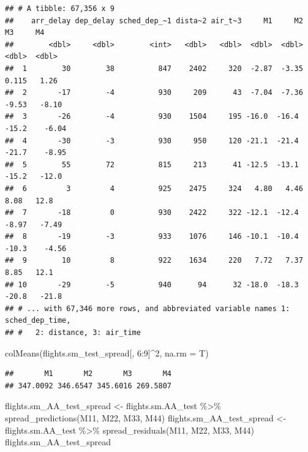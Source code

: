 \documentclass[
]{article}
\newenvironment{Shaded}{\begin{snugshade}}{\end{snugshade}}
\newcommand{\AttributeTok}[1]{\textcolor[rgb]{0.77,0.63,0.00}{#1}}
\newcommand{\DecValTok}[1]{\textcolor[rgb]{0.00,0.00,0.81}{#1}}
\newcommand{\FunctionTok}[1]{\textcolor[rgb]{0.00,0.00,0.00}{#1}}
\newcommand{\NormalTok}[1]{#1}
\newcommand{\OtherTok}[1]{\textcolor[rgb]{0.56,0.35,0.01}{#1}}
\newcommand{\SpecialCharTok}[1]{\textcolor[rgb]{0.00,0.00,0.00}{#1}}
\begin{document}
\begin{verbatim}
## # A tibble: 67,356 x 9
##    arr_delay dep_delay sched_dep_~1 dista~2 air_t~3     M1     M2      M3     M4
##        <dbl>     <dbl>        <int>   <dbl>   <dbl>  <dbl>  <dbl>   <dbl>  <dbl>
##  1        30        38          847    2402     320  -2.87  -3.35   0.115   1.26
##  2       -17        -4          930     209      43  -7.04  -7.36  -9.53   -8.10
##  3       -26        -4          930    1504     195 -16.0  -16.4  -15.2    -6.04
##  4       -30        -3          930     950     120 -21.1  -21.4  -21.7    -8.95
##  5        55        72          815     213      41 -12.5  -13.1  -15.2   -12.0 
##  6         3         4          925    2475     324   4.80   4.46   8.08   12.8 
##  7       -18         0          930    2422     322 -12.1  -12.4   -8.97   -7.49
##  8       -19        -3          933    1076     146 -10.1  -10.4  -10.3    -4.56
##  9        10         8          922    1634     220   7.72   7.37   8.85   12.1 
## 10       -29        -5          940      94      32 -18.0  -18.3  -20.8   -21.8 
## # ... with 67,346 more rows, and abbreviated variable names 1: sched_dep_time,
## #   2: distance, 3: air_time
\end{verbatim}

\begin{Shaded}
\begin{Highlighting}[]
\FunctionTok{colMeans}\NormalTok{(flights.sm\_test\_spread[, }\DecValTok{6}\SpecialCharTok{:}\DecValTok{9}\NormalTok{]}\SpecialCharTok{\^{}}\DecValTok{2}\NormalTok{, }\AttributeTok{na.rm =}\NormalTok{ T)}
\end{Highlighting}
\end{Shaded}

\begin{verbatim}
##       M1       M2       M3       M4 
## 347.0092 346.6547 345.6016 269.5807
\end{verbatim}

\begin{Shaded}
\begin{Highlighting}[]
\NormalTok{flights.sm\_AA\_test\_spread }\OtherTok{\textless{}{-}}\NormalTok{ flights.sm.AA\_test }\SpecialCharTok{\%\textgreater{}\%}
    \FunctionTok{spread\_predictions}\NormalTok{(M11, M22, M33, M44)}
\NormalTok{flights.sm\_AA\_test\_spread }\OtherTok{\textless{}{-}}\NormalTok{ flights.sm.AA\_test }\SpecialCharTok{\%\textgreater{}\%}
    \FunctionTok{spread\_residuals}\NormalTok{(M11, M22, M33, M44)}
\NormalTok{flights.sm\_AA\_test\_spread}
\end{Highlighting}
\end{Shaded}
\end{document}
